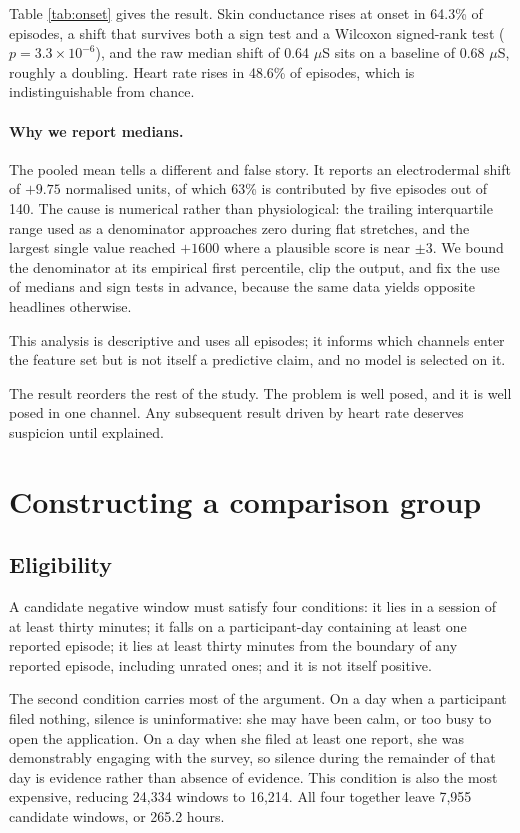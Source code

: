 \documentclass{article}
\begin{document}
Table \ref{tab:onset} gives the result. Skin conductance rises at onset in
64.3\% of episodes, a shift that survives both a sign test and a
Wilcoxon signed-rank test ($p = 3.3 \times 10^{-6}$), and the raw median shift
of 0.64 $\mu$S sits on a baseline of 0.68 $\mu$S,
roughly a doubling. Heart rate rises in 48.6\% of episodes, which
is indistinguishable from chance.

\paragraph{Why we report medians.} The pooled mean tells a different and false
story. It reports an electrodermal shift of $+9.75$ normalised units, of which
63\% is contributed by five episodes out of 140. The cause is
numerical rather than physiological: the trailing interquartile range used as a
denominator approaches zero during flat stretches, and the largest single value
reached $+1600$ where a plausible score is near $\pm 3$. We bound the
denominator at its empirical first percentile, clip the output, and fix the use
of medians and sign tests in advance, because the same data yields opposite
headlines otherwise.

This analysis is descriptive and uses all episodes; it informs which channels
enter the feature set but is not itself a predictive claim, and no model is
selected on it.

The result reorders the rest of the study. The problem is well posed, and it is
well posed in one channel. Any subsequent result driven by heart rate deserves
suspicion until explained.

\section{Constructing a comparison group}
\label{sec:negatives}

\subsection{Eligibility}

A candidate negative window must satisfy four conditions: it lies in a session
of at least thirty minutes; it falls on a participant-day containing at least
one reported episode; it lies at least thirty minutes from the boundary of any
reported episode, including unrated ones; and it is not itself positive.

The second condition carries most of the argument. On a day when a participant
filed nothing, silence is uninformative: she may have been calm, or too busy to
open the application. On a day when she filed at least one report, she was
demonstrably engaging with the survey, so silence during the remainder of that
day is evidence rather than absence of evidence. This condition is also the
most expensive, reducing 24{,}334 windows to 16{,}214. All four together leave
7{,}955 candidate windows, or 265.2 hours.
\end{document}
